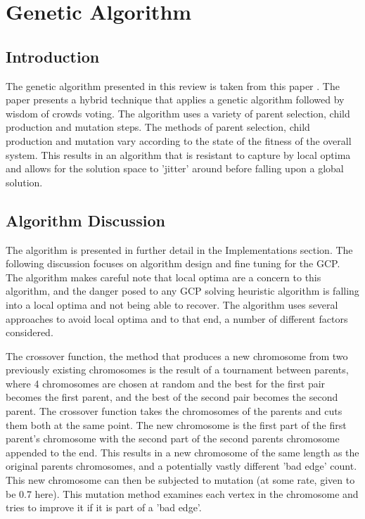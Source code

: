 \section{Genetic Algorithm}
\subsection{Introduction}
The genetic algorithm presented in this review is taken from this paper \cite{bib:GeneticAlg}. The paper presents a hybrid technique that applies a genetic algorithm followed by wisdom of crowds voting. The algorithm uses a variety of parent selection, child production and mutation steps. The methods of parent selection, child production and mutation vary according to the state of the fitness of the overall system. This results in an algorithm that is resistant to capture by local optima and allows for the solution space to 'jitter' around before falling upon a global solution. 

\subsection{Algorithm Discussion}
The algorithm is presented in further detail in the Implementations section. The following discussion focuses on algorithm design and fine tuning for the GCP. The algorithm makes careful note that local optima are a concern to this algorithm, and the danger posed to any GCP solving heuristic algorithm is falling into a local optima and not being able to recover. The algorithm uses several approaches to avoid local optima and to that end, a number of different factors considered. 

The crossover function, the method that produces a new chromosome from two previously existing chromosomes is the result of a tournament between parents, where 4 chromosomes are chosen at random and the best for the first pair becomes the first parent, and the best of the second pair becomes the second parent. The crossover function takes the chromosomes of the parents and cuts them both at the same point. The new chromosome is the first part of the first parent's chromosome with the second part of the second parents chromosome appended to the end. This results in a new chromosome of the same length as the original parents chromosomes, and a potentially vastly different 'bad edge' count. This new chromosome can then be subjected to mutation (at some rate, given to be 0.7 here). This mutation method examines each vertex in the chromosome and tries to improve it if it is part of a 'bad edge'. 

